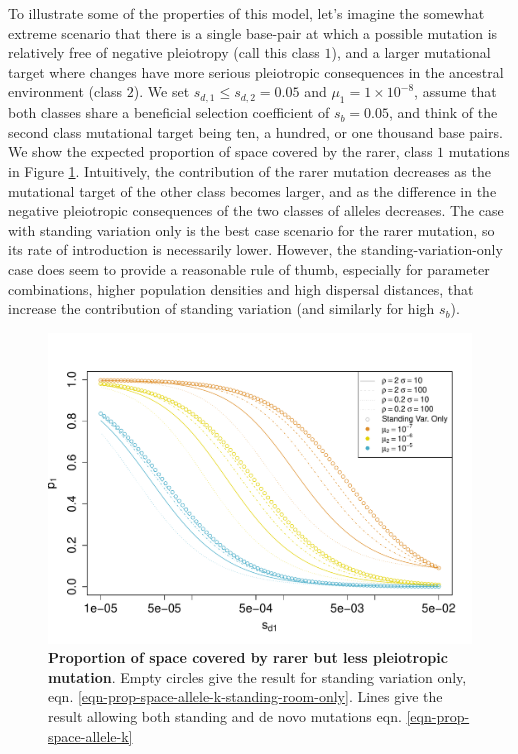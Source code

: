 \documentclass{article}
\begin{document}
To illustrate some of the properties of this model, 
let's imagine the somewhat extreme scenario that there is a single base-pair 
at which a possible mutation is relatively free of negative pleiotropy (call this class $1$), 
and a larger mutational target where changes 
have more serious pleiotropic consequences in the ancestral environment (class $2$). 
We set $s_{d,1} \leq s_{d,2}=0.05$ and $\mu_1=1 \times 10^{-8}$, 
assume that both classes share a beneficial selection coefficient of $s_b=0.05$,
and think of the second class mutational target being ten, a hundred, or one thousand base pairs. 
We show the expected proportion of space covered by
the rarer, class $1$ mutations in Figure \ref{fig-pleiotropy_calc}.
Intuitively, the contribution of the rarer mutation decreases as the
mutational target of the other class becomes larger, and as the
difference in the negative pleiotropic consequences of the two classes of alleles decreases. 
The case with standing variation only is the best case scenario 
for the rarer mutation, so its rate of introduction is necessarily lower. 
However, the standing-variation-only case does seem to provide a
reasonable rule of thumb, especially for parameter combinations, 
higher population densities and high dispersal distances, 
that increase the contribution of standing variation (and similarly for high $s_b$). 

\begin{figure}[ht]
\begin{center}
  \includegraphics[width=1.0\textwidth]{pleiotropy_calc}
\caption{ %
{\bf Proportion of space covered by rarer but less pleiotropic
  mutation}. Empty circles give the result for standing variation only,
  eqn. \eqref{eqn-prop-space-allele-k-standing-room-only}. Lines give
  the result allowing both standing and de novo mutations  eqn. \eqref{eqn-prop-space-allele-k}}   \label{fig-pleiotropy_calc}
\end{center}
\end{figure}
\end{document}
